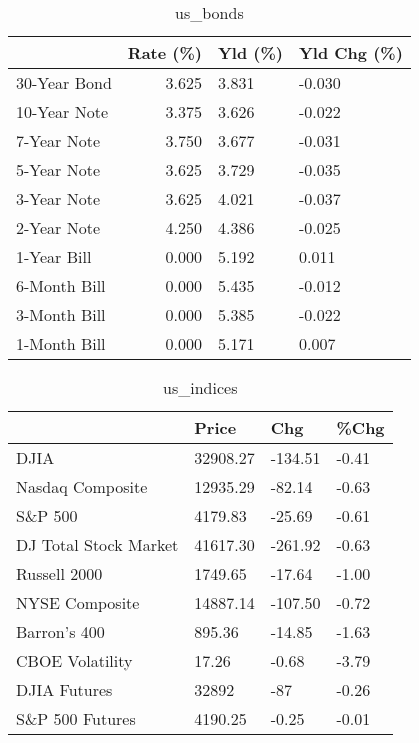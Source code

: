 \documentclass{article}%
\begin{document}
%


\begin{table}[htbp]%
\caption{us\_bonds}%
\centering%
\begin{adjustbox}{width=1\textwidth}%
\begin{tabular}{lrll}
\toprule
             &  Rate (\%) & Yld (\%) & Yld Chg (\%) \\
\midrule
30-Year Bond &     3.625 &   3.831 &      -0.030 \\
10-Year Note &     3.375 &   3.626 &      -0.022 \\
 7-Year Note &     3.750 &   3.677 &      -0.031 \\
 5-Year Note &     3.625 &   3.729 &      -0.035 \\
 3-Year Note &     3.625 &   4.021 &      -0.037 \\
 2-Year Note &     4.250 &   4.386 &      -0.025 \\
 1-Year Bill &     0.000 &   5.192 &       0.011 \\
6-Month Bill &     0.000 &   5.435 &      -0.012 \\
3-Month Bill &     0.000 &   5.385 &      -0.022 \\
1-Month Bill &     0.000 &   5.171 &       0.007 \\
\bottomrule
\end{tabular}
%
\end{adjustbox}%
\end{table}

%


\begin{table}[htbp]%
\caption{us\_indices}%
\centering%
\begin{adjustbox}{width=1\textwidth}%
\begin{tabular}{llll}
\toprule
                      &    Price &     Chg &  \%Chg \\
\midrule
                 DJIA & 32908.27 & -134.51 & -0.41 \\
     Nasdaq Composite & 12935.29 &  -82.14 & -0.63 \\
              S\&P 500 &  4179.83 &  -25.69 & -0.61 \\
DJ Total Stock Market & 41617.30 & -261.92 & -0.63 \\
         Russell 2000 &  1749.65 &  -17.64 & -1.00 \\
       NYSE Composite & 14887.14 & -107.50 & -0.72 \\
         Barron's 400 &   895.36 &  -14.85 & -1.63 \\
      CBOE Volatility &    17.26 &   -0.68 & -3.79 \\
         DJIA Futures &    32892 &     -87 & -0.26 \\
      S\&P 500 Futures &  4190.25 &   -0.25 & -0.01 \\
\bottomrule
\end{tabular}
%
\end{adjustbox}%
\end{table}
\end{document}
